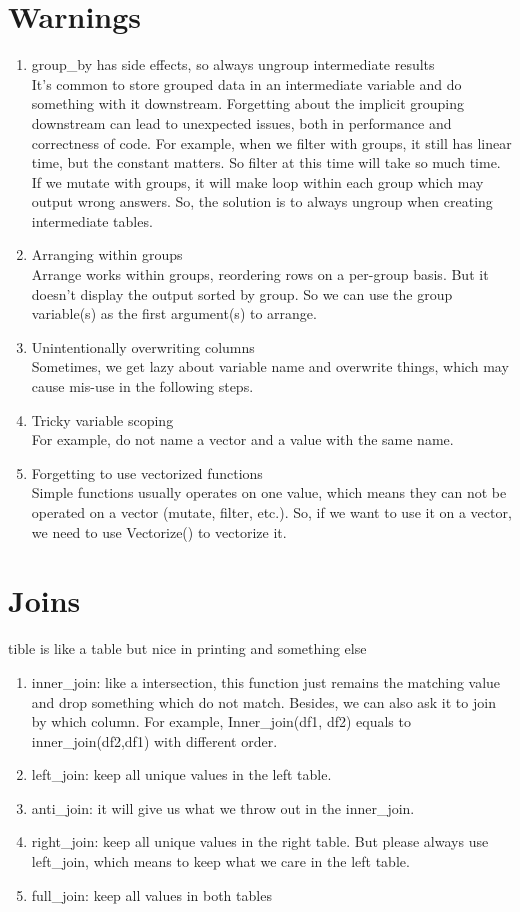 \section{Warnings}
\begin{enumerate}
  \item group\_by has side effects, so always ungroup intermediate results\\
  It's common to store grouped data in an intermediate variable and do something with it downstream. Forgetting about the implicit grouping downstream can lead to unexpected issues, both in performance and correctness of code. For example, when we filter with groups, it still has linear time, but the constant matters. So filter at this time will take so much time. If we mutate with groups, it will make loop within each group which may output wrong answers. So, the solution is to always ungroup when creating intermediate tables.
  \item Arranging within groups\\
   Arrange works within groups, reordering rows on a per-group basis. But it doesn't display the output sorted by group. So we can use the group variable(s) as the first argument(s) to arrange.
  \item Unintentionally overwriting columns\\
  Sometimes, we get lazy about variable name and overwrite things, which may cause mis-use in the following steps.
  \item Tricky variable scoping\\
  For example, do not name a vector and a value with the same name.
  \item Forgetting to use vectorized functions\\
  Simple functions usually operates on one value, which means they can not be operated on a vector (mutate, filter, etc.). So, if we want to use it on a vector, we need to use Vectorize() to vectorize it. 
\end{enumerate}

\section{Joins}
tible is like a table but nice in printing and something else
\begin{enumerate}
  \item inner\_join: like a intersection, this function just remains the matching value and drop something which do not match. Besides, we can also ask it to join by which column. For example, Inner\_join(df1, df2) equals to inner\_join(df2,df1) with different order. 
  \item left\_join: keep all unique values in the left table.
  \item anti\_join: it will give us what we throw out in the inner\_join.
  \item right\_join: keep all unique values in the right table. But please always use left\_join, which means to keep what we care in the left table.
  \item full\_join: keep all values in both tables
\end{enumerate}


